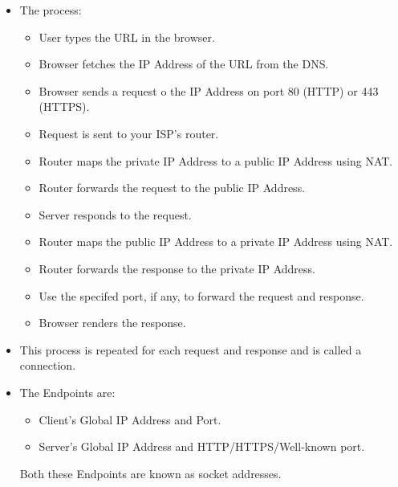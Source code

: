 \documentclass[a4paper, twoside]{report}
\begin{document}
\begin{itemize}
    \item The process:
    \begin{itemize}
        \item User types the URL in the browser.
        \item Browser fetches the IP Address of the URL from the DNS\@.
        \item Browser sends a request  o the IP Address on port 80 (HTTP) or 443 (HTTPS).
        \item Request is sent to your ISP's router.
        \item Router maps the private IP Address to a public IP Address using NAT\@.
        \item Router forwards the request to the public IP Address.
        \item Server responds to the request.
        \item Router maps the public IP Address to a private IP Address using NAT\@.
        \item Router forwards the response to the private IP Address.
        \item Use the specifed port, if any, to forward the request and response.
        \item Browser renders the response.
    \end{itemize}
    \item This process is repeated for each request and response and is called a connection.
    \item The Endpoints are:
    \begin{itemize}
        \item Client's Global IP Address and Port.
        \item Server's Global IP Address and HTTP/HTTPS/Well-known port.
    \end{itemize}
    Both these Endpoints are known as socket addresses.
\end{itemize}
\end{document}
